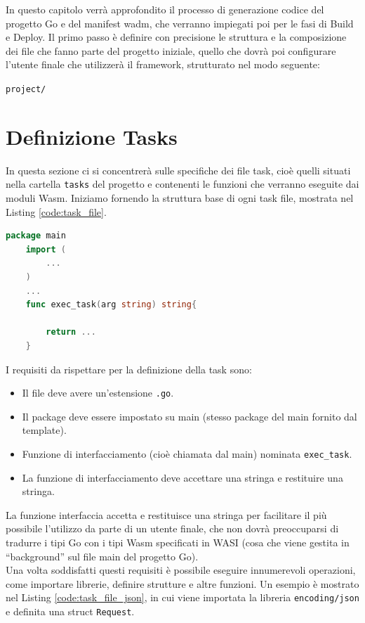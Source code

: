 In questo capitolo verrà approfondito il processo di generazione codice del progetto Go e del manifest wadm, che verranno impiegati poi per le fasi di Build e Deploy. Il primo passo è definire con precisione le struttura e la composizione dei file che fanno parte del progetto iniziale, quello che dovrà poi configurare l'utente finale che utilizzerà il framework, strutturato nel modo seguente:

\texttt{project/}

\section{Definizione Tasks}

In questa sezione ci si concentrerà sulle specifiche dei file task, cioè quelli situati nella cartella \texttt{tasks} del progetto e contenenti le funzioni che verranno eseguite dai moduli Wasm. Iniziamo fornendo la struttura base di ogni task file, mostrata nel Listing \ref{code:task_file}.
\begin{lstlisting}[language=Go, caption={Struttura base file task}, captionpos=b, label={code:task_file}]
    package main
    import (
    	...
    )
    ...    
    func exec_task(arg string) string{
    
    	return ... 
    }
\end{lstlisting}

I requisiti da rispettare per la definizione della task sono:
\begin{itemize}
    \item Il file deve avere un'estensione \texttt{.go}.
    \item Il package deve essere impostato su main (stesso package del main fornito dal template).
    \item Funzione di interfacciamento (cioè chiamata dal main) nominata \texttt{exec\_task}.
    \item La funzione di interfacciamento deve accettare una stringa e restituire una stringa.
\end{itemize}

La funzione interfaccia accetta e restituisce una stringa per facilitare il più possibile l'utilizzo da parte di un utente finale, che non dovrà preoccuparsi di tradurre i tipi Go con i tipi Wasm specificati in WASI (cosa che viene gestita in ``background'' sul file main del progetto Go).\\
Una volta soddisfatti questi requisiti è possibile eseguire innumerevoli operazioni, come importare librerie, definire strutture e altre funzioni. Un esempio è mostrato nel Listing \ref{code:task_file_json}, in cui viene importata la libreria \texttt{encoding/json} e definita una struct \texttt{Request}.

